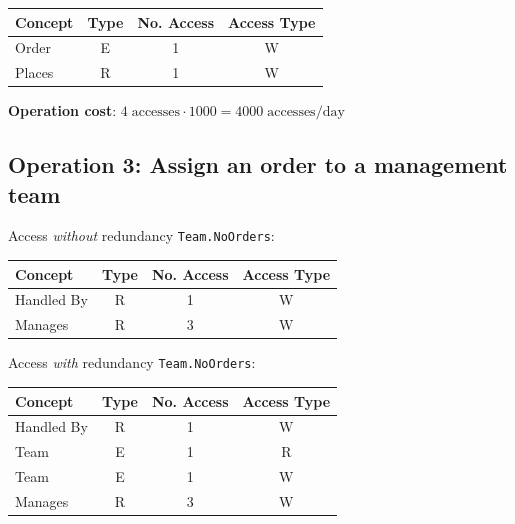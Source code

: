     \begin{table}[h!]
        \centering
        \begin{tabular}{|l|c|c|c|}
        \hline
        \textbf{Concept} & \textbf{Type} & \textbf{No. Access} & \textbf{Access Type} \\
        \hline
        Order   & E & 1 & W \\
        \hline
        Places  & R & 1 & W \\
        \hline
        \end{tabular}
    \end{table}
        
    \textbf{Operation cost}: $4 \; \text{accesses} \cdot 1000 = 4000 \; \text{accesses/day}$
    \subsection*{Operation 3: Assign an order to a management team}
    
    Access \textit{without} redundancy \texttt{Team.NoOrders}:
    
    \begin{table}[h!]
    \centering
    \begin{tabular}{|l|c|c|c|}
    \hline
    \textbf{Concept} & \textbf{Type} & \textbf{No. Access} & \textbf{Access Type} \\
    \hline
    Handled By & R & 1 & W \\
    \hline
    Manages    & R & 3 & W \\
    \hline
    \end{tabular}
    \end{table}
    
    Access \textit{with} redundancy \texttt{Team.NoOrders}:
    
    \begin{table}[h!]
    \centering
    \begin{tabular}{|l|c|c|c|}
    \hline
    \textbf{Concept} & \textbf{Type} & \textbf{No. Access} & \textbf{Access Type} \\
    \hline
    Handled By & R & 1 & W \\
    \hline
    Team       & E & 1 & R \\
    \hline
    Team       & E & 1 & W \\
    \hline
    Manages    & R & 3 & W \\
    \hline
    \end{tabular}
    \end{table}
    
